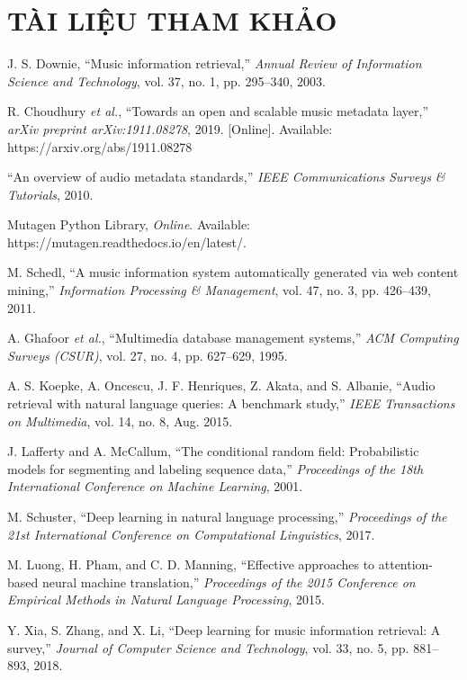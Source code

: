 \documentclass[conference]{IEEEtran}
\begin{document}
\section{TÀI LIỆU THAM KHẢO}
\begin{thebibliography}{1}

J. S. Downie, ``Music information retrieval,'' \textit{Annual Review of Information Science and Technology}, vol. 37, no. 1, pp. 295--340, 2003.

R. Choudhury \textit{et al.}, ``Towards an open and scalable music metadata layer,'' \textit{arXiv preprint arXiv:1911.08278}, 2019. [Online]. Available: https://arxiv.org/abs/1911.08278

``An overview of audio metadata standards,'' \textit{IEEE Communications Surveys \& Tutorials}, 2010.

Mutagen Python Library, \textit{Online}. Available: https://mutagen.readthedocs.io/en/latest/.

M. Schedl, ``A music information system automatically generated via web content mining,'' \textit{Information Processing \& Management}, vol. 47, no. 3, pp. 426--439, 2011.

A. Ghafoor \textit{et al.}, ``Multimedia database management systems,'' \textit{ACM Computing Surveys (CSUR)}, vol. 27, no. 4, pp. 627--629, 1995.

A. S. Koepke, A. Oncescu, J. F. Henriques, Z. Akata, and S. Albanie, “Audio retrieval with natural language queries: A benchmark study,” \textit{IEEE Transactions on Multimedia}, vol. 14, no. 8, Aug. 2015.


J. Lafferty and A. McCallum, ``The conditional random field: Probabilistic models for segmenting and labeling sequence data,'' \textit{Proceedings of the 18th International Conference on Machine Learning}, 2001.

M. Schuster, ``Deep learning in natural language processing,'' \textit{Proceedings of the 21st International Conference on Computational Linguistics}, 2017.

M. Luong, H. Pham, and C. D. Manning, ``Effective approaches to attention-based neural machine translation,'' \textit{Proceedings of the 2015 Conference on Empirical Methods in Natural Language Processing}, 2015.

Y. Xia, S. Zhang, and X. Li, ``Deep learning for music information retrieval: A survey,'' \textit{Journal of Computer Science and Technology}, vol. 33, no. 5, pp. 881--893, 2018.





\end{thebibliography}
\end{document}
